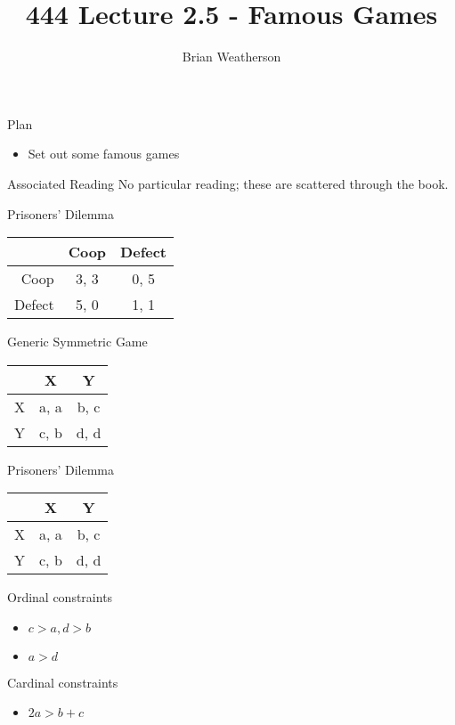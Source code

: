 \documentclass[
  ignorenonframetext,
]{beamer}
\title{444 Lecture 2.5 - Famous Games}
\author{Brian Weatherson}
\date{}
\providecommand{\tightlist}{%
  \setlength{\itemsep}{0pt}\setlength{\parskip}{0pt}}
\begin{document}
\frame{\titlepage}

\begin{frame}{Plan}
\protect\hypertarget{plan}{}
\begin{itemize}
\tightlist
\item
  Set out some famous games
\end{itemize}
\end{frame}

\begin{frame}{Associated Reading}
\protect\hypertarget{associated-reading}{}
No particular reading; these are scattered through the book.
\end{frame}

\begin{frame}{Prisoners' Dilemma}
\protect\hypertarget{prisoners-dilemma}{}
\begin{table}[!h]
\centering
\begin{tabular}[t]{>{}r|cc}
\toprule
 & Coop & Defect\\
\midrule
Coop & 3, 3 & 0, 5\\
Defect & 5, 0 & 1, 1\\
\bottomrule
\end{tabular}
\end{table}
\end{frame}

\begin{frame}{Generic Symmetric Game}
\protect\hypertarget{generic-symmetric-game}{}
\begin{table}[!h]
\centering
\begin{tabular}[t]{>{}r|cc}
\toprule
 & X & Y\\
\midrule
X & a, a & b, c\\
Y & c, b & d, d\\
\bottomrule
\end{tabular}
\end{table}
\end{frame}

\begin{frame}{Prisoners' Dilemma}
\protect\hypertarget{prisoners-dilemma-1}{}
\begin{table}[!h]
\centering
\begin{tabular}[t]{>{}r|cc}
\toprule
 & X & Y\\
\midrule
X & a, a & b, c\\
Y & c, b & d, d\\
\bottomrule
\end{tabular}
\end{table}

Ordinal constraints

\begin{itemize}
\tightlist
\item
  \(c > a, d > b\)
\item
  \(a > d\)
\end{itemize}

Cardinal constraints

\begin{itemize}
\tightlist
\item
  \(2a > b + c\)
\end{itemize}
\end{frame}
\end{document}
